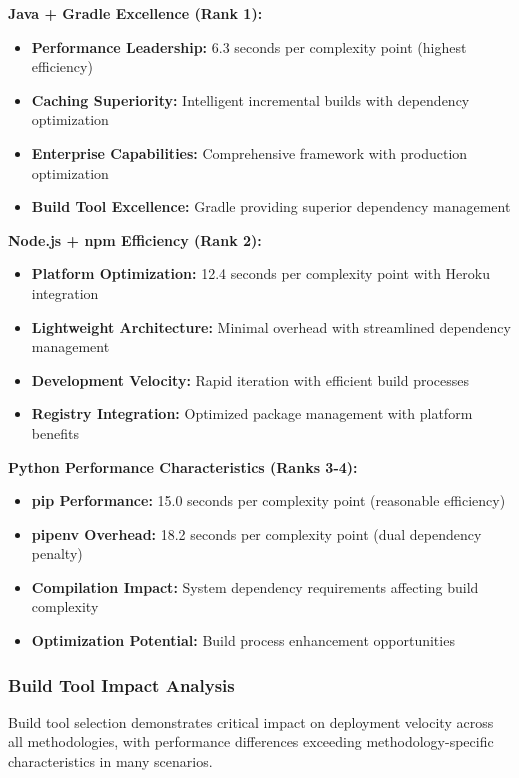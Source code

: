 \textbf{Java + Gradle Excellence (Rank 1):}
\begin{itemize}
\item \textbf{Performance Leadership:} 6.3 seconds per complexity point (highest efficiency)
\item \textbf{Caching Superiority:} Intelligent incremental builds with dependency optimization
\item \textbf{Enterprise Capabilities:} Comprehensive framework with production optimization
\item \textbf{Build Tool Excellence:} Gradle providing superior dependency management
\end{itemize}

\textbf{Node.js + npm Efficiency (Rank 2):}
\begin{itemize}
\item \textbf{Platform Optimization:} 12.4 seconds per complexity point with Heroku integration
\item \textbf{Lightweight Architecture:} Minimal overhead with streamlined dependency management
\item \textbf{Development Velocity:} Rapid iteration with efficient build processes
\item \textbf{Registry Integration:} Optimized package management with platform benefits
\end{itemize}

\textbf{Python Performance Characteristics (Ranks 3-4):}
\begin{itemize}
\item \textbf{pip Performance:} 15.0 seconds per complexity point (reasonable efficiency)
\item \textbf{pipenv Overhead:} 18.2 seconds per complexity point (dual dependency penalty)
\item \textbf{Compilation Impact:} System dependency requirements affecting build complexity
\item \textbf{Optimization Potential:} Build process enhancement opportunities
\end{itemize}

\subsubsection{Build Tool Impact Analysis}

Build tool selection demonstrates critical impact on deployment velocity across all methodologies, with performance differences exceeding methodology-specific characteristics in many scenarios.

